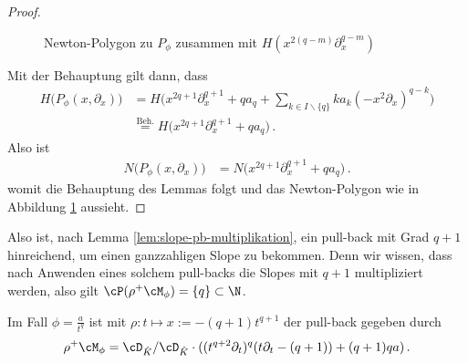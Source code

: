 \begin{proof}
\begin{figure}[htbp]
\begin{center}
\end{center}
\caption{Newton-Polygon zu $P_{\phi}$ zusammen mit
  $H(x^{2(q-m)}\partial_x^{q-m})$}
\label{fig:Newton-PolygonP_phi}
\end{figure}
Mit der Behauptung gilt dann, dass
\begin{align*}
H\Big(P_{\phi}(x,\partial_x)\Big)
  &= H\Big(x^{2q + 1}\partial_x^{q + 1} + qa_q
  + \sum_{k\in I\backslash\{q\}}k a_k(-x^2\partial_x)^{q-k} \Big)
\\&\!\!\overset{\text{Beh.}}{=} H\Big(x^{2q + 1}\partial_x^{q + 1} + qa_q \Big)
  \,.
\end{align*}
Also ist
\begin{align*}
N\Big(P_{\phi}(x,\partial_x)\Big)
  &= N\Big(x^{2q + 1}\partial_x^{q + 1} + qa_q \Big) \,.
\end{align*}
womit die Behauptung des Lemmas folgt und das Newton-Polygon wie in Abbildung
\ref{fig:Newton-PolygonP_phi} aussieht.
\end{proof}
Also ist, nach Lemma \ref{lem:slope-pb-multiplikation}, ein pull-back mit Grad
$q+1$ hinreichend, um einen ganzzahligen Slope zu bekommen. Denn wir wissen,
dass nach Anwenden eines solchem pull-backs die Slopes mit ${q+1}$
multipliziert werden, also gilt $\cP(\rho^+\cM_\phi)=\{q\}\subset\N$.
\begin{lem}
Im Fall $\phi=\frac{a}{t^{q}}$ ist mit $\rho:t\mapsto x:=-(q+1) t^{q+1}$ der
pull-back gegeben durch
\[
\rho^+\cM_\phi =\cD_{\hat K}/\cD_{\hat K} \cdot((t^{q+2}\partial_t)^{q}
    (t\partial_t-(q+1))+(q+1)qa) \,.
\]
\end{lem}
